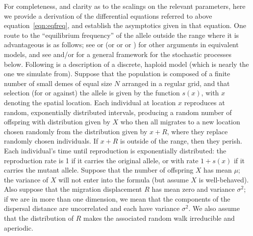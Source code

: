 \documentclass{article}
\newcommand{\citet}[1]{\cite{#1}}
\begin{document}
For completeness, and clarity as to the scalings on the relevant parameters,
here we provide a derivation of the differential equations referred to above equation~\eqref{eqn:eqfreq},
and establish the asymptotics given in that equation.
One route to the ``equilibrium frequency'' of the allele outside the range where it is advantageous is as follows;
see \citet{slatkin1973geneflow} or \citet{barton1987establishment}
(or \citet{KPP1937book} or \citet{fisher1937wave} or \citet{haldane1948theory})
for other arguments in equivalent models,
and see \citet{etheridge2000introduction} and/or \citet{dawson1993measurevalued} for a general framework for the stochastic processes below.
Following is a description of a discrete, haploid model (which is nearly the one we simulate from).
Suppose that the population is composed of a finite number of small demes of equal size $N$ arranged in a regular grid,
and that selection (for or against) the allele is given by the function $s(x)$, with $x$ denoting the spatial location.
Each individual at location $x$ reproduces at random, exponentially distributed intervals,
producing a random number of offspring with distribution given by $X$
who then all migrates to a new location chosen randomly from the distribution given by $x+R$,
where they replace randomly chosen individuals.
If $x+R$ is outside of the range, then they perish.
Each individual's time until reproduction is exponentially distributed:
the reproduction rate is 1 if it carries the original allele, or with rate $1+s(x)$ if it carries the mutant allele.
Suppose that the number of offspring $X$ has mean $\mu$; the variance of $X$ will not enter into the formula
(but assume $X$ is well-behaved).
Also suppose that the migration displacement $R$ has mean zero and variance $\sigma^2$;
if we are in more than one dimension, we mean that the components of the dispersal distance are uncorrelated
and each have variance $\sigma^2$.
We also assume that the distribution of $R$ makes the associated random walk irreducible and aperiodic.
\end{document}
